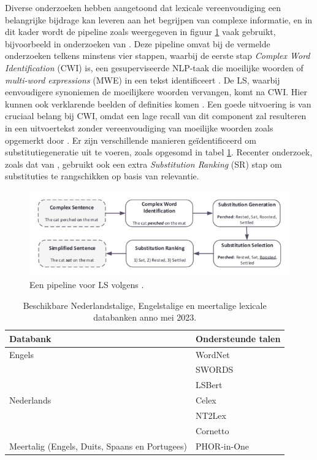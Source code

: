 Diverse onderzoeken hebben aangetoond dat lexicale vereenvoudiging een belangrijke bijdrage kan leveren aan het begrijpen van complexe informatie, en in dit kader wordt de pipeline zoals weergegeven in figuur \ref{img:pipeline-lexical-simplification} vaak gebruikt, bijvoorbeeld in onderzoeken van \textcite{Paetzold2016, Bingel2018, Bulte2018}. Deze pipeline omvat bij de vermelde onderzoeken telkens minstens vier stappen, waarbij de eerste stap \textit{Complex Word Identification} (CWI) is, een gesuperviseerde NLP-taak die moeilijke woorden of \textit{multi-word expressions} (MWE) in een tekst identificeert \autocite{Shardlow2013, Gooding2019}. De LS, waarbij eenvoudigere synoniemen de moeilijkere woorden vervangen, komt na CWI. Hier kunnen ook verklarende beelden of definities komen \autocite{Zeng2005, Kandula2010}. Een goede uitvoering is van cruciaal belang bij CWI, omdat een lage recall van dit component zal resulteren in een uitvoertekst zonder vereenvoudiging van moeilijke woorden zoals opgemerkt door \textcite{Shardlow2013}. Er zijn verschillende manieren geïdentificeerd om substitutiegeneratie uit te voeren, zoals opgesomd in tabel \ref{table:lexical-databases}. Recenter onderzoek, zoals dat van \textcite{Zhou2019}, gebruikt ook een extra \textit{Substitution Ranking} (SR) stap om substituties te rangschikken op basis van relevantie. 

\begin{figure}[H]
	\includegraphics[width=15cm]{img/lexical-simplification-pipeline.png}
	\caption{Een pipeline voor LS volgens \textcite{Althunayyan2021}.}
	\label{img:pipeline-lexical-simplification}
\end{figure}

\begin{center}
\begin{table}[H]
	\begin{tabular}{ | m{7cm} | m{7cm} | } 
		\hline
		\textbf{Databank} & \textbf{Ondersteunde talen} \\
		\hline
		Engels & WordNet \\
		& SWORDS \\
		& LSBert \\
		\hline
		Nederlands & Celex \\
		& NT2Lex \\
		& Cornetto \\
		\hline
		Meertalig (Engels, Duits, Spaans en Portugees) & PHOR-in-One \\
		\hline	
	\end{tabular}
	\caption{Beschikbare Nederlandstalige, Engelstalige en meertalige lexicale databanken anno mei 2023.}
	\label{table:lexical-databases}
\end{table}
\end{center}

